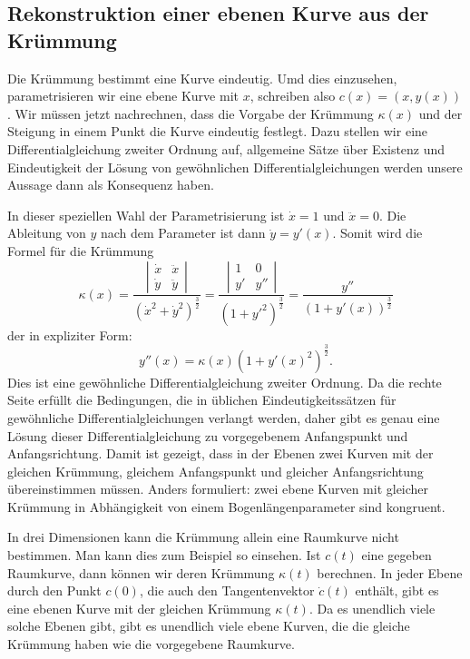 \subsection{Rekonstruktion einer ebenen Kurve aus der Krümmung}
Die Krümmung bestimmt eine Kurve eindeutig.
Umd dies einzusehen, parametrisieren wir eine ebene Kurve mit
$x$, schreiben also $c(x)=(x,y(x))$.
Wir müssen jetzt nachrechnen, dass die Vorgabe der Krümmung $\kappa(x)$
und der Steigung in einem Punkt die Kurve eindeutig festlegt.
Dazu stellen wir eine Differentialgleichung zweiter Ordnung auf,
allgemeine Sätze über Existenz und Eindeutigkeit der Lösung von
gewöhnlichen Differentialgleichungen werden unsere Aussage dann
als Konsequenz haben.

In dieser speziellen Wahl der Parametrisierung ist $\dot x = 1$ und
$\ddot x=0$.
Die Ableitung von $y$ nach dem Parameter ist dann $\dot y=y'(x)$.
Somit wird die Formel für die Krümmung
\[
\kappa(x)
=
\frac{\left|\begin{matrix}\dot x&\ddot x\\\dot y&\ddot y\end{matrix}\right|}{(\dot x^2+\dot y^2)^{\frac32}}
=
\frac{\left|\begin{matrix}1&0\\y'&y''\end{matrix}\right|}{(1+y'^2)^{\frac32}}
=
\frac{y''}{(1+y'(x))^{\frac32}}
\]
der in expliziter Form:
\[
y''(x)=\kappa(x) (1+y'(x)^2)^{\frac32}.
\]
Dies ist eine gewöhnliche Differentialgleichung zweiter Ordnung.
Da die rechte Seite erfüllt die Bedingungen, die in üblichen
Eindeutigkeitssätzen für gewöhnliche Differentialgleichungen
verlangt werden, daher gibt es genau eine Lösung dieser
Differentialgleichung zu vorgegebenem Anfangspunkt und Anfangsrichtung.
Damit ist gezeigt, dass in der Ebenen zwei Kurven mit der gleichen
Krümmung, gleichem Anfangspunkt und gleicher Anfangsrichtung übereinstimmen
müssen.
Anders formuliert: zwei ebene Kurven mit gleicher Krümmung in Abhängigkeit
von einem Bogenlängenparameter sind kongruent.

In drei Dimensionen kann die Krümmung allein eine Raumkurve nicht bestimmen.
Man kann dies zum Beispiel so einsehen.
Ist $c(t)$ eine gegeben Raumkurve, dann können wir deren Krümmung
$\kappa(t)$ berechnen.
In jeder Ebene durch den Punkt $c(0)$, die auch den Tangentenvektor
$\dot c(t)$ enthält, gibt es eine ebenen Kurve mit der gleichen
Krümmung $\kappa(t)$.
Da es unendlich viele solche Ebenen gibt, gibt es unendlich viele 
ebene Kurven, die die gleiche Krümmung haben wie die vorgegebene
Raumkurve.

